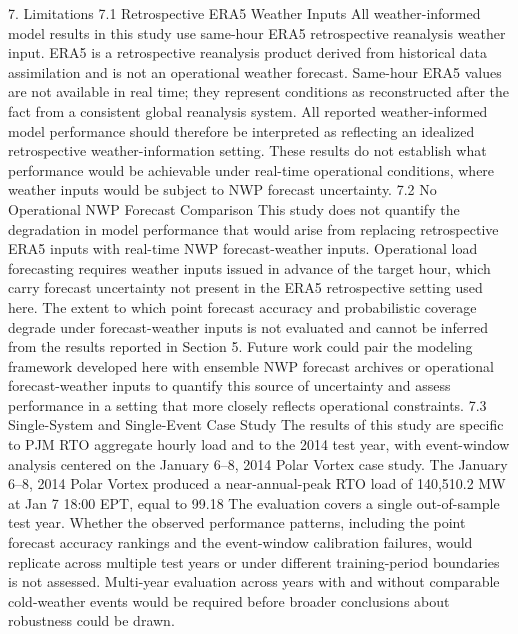 7. Limitations
7.1 Retrospective ERA5 Weather Inputs
All weather-informed model results in this study use same-hour ERA5 retrospective reanalysis weather input. ERA5 is a retrospective reanalysis product derived from historical data assimilation and is not an operational weather forecast. Same-hour ERA5 values are not available in real time; they represent conditions as reconstructed after the fact from a consistent global reanalysis system. All reported weather-informed model performance should therefore be interpreted as reflecting an idealized retrospective weather-information setting. These results do not establish what performance would be achievable under real-time operational conditions, where weather inputs would be subject to NWP forecast uncertainty.
7.2 No Operational NWP Forecast Comparison
This study does not quantify the degradation in model performance that would arise from replacing retrospective ERA5 inputs with real-time NWP forecast-weather inputs. Operational load forecasting requires weather inputs issued in advance of the target hour, which carry forecast uncertainty not present in the ERA5 retrospective setting used here. The extent to which point forecast accuracy and probabilistic coverage degrade under forecast-weather inputs is not evaluated and cannot be inferred from the results reported in Section 5. Future work could pair the modeling framework developed here with ensemble NWP forecast archives or operational forecast-weather inputs to quantify this source of uncertainty and assess performance in a setting that more closely reflects operational constraints.
7.3 Single-System and Single-Event Case Study
The results of this study are specific to PJM RTO aggregate hourly load and to the 2014 test year, with event-window analysis centered on the January 6–8, 2014 Polar Vortex case study. The January 6–8, 2014 Polar Vortex produced a near-annual-peak RTO load of 140,510.2 MW at Jan 7 18:00 EPT, equal to 99.18%
The evaluation covers a single out-of-sample test year. Whether the observed performance patterns, including the point forecast accuracy rankings and the event-window calibration failures, would replicate across multiple test years or under different training-period boundaries is not assessed. Multi-year evaluation across years with and without comparable cold-weather events would be required before broader conclusions about robustness could be drawn.
